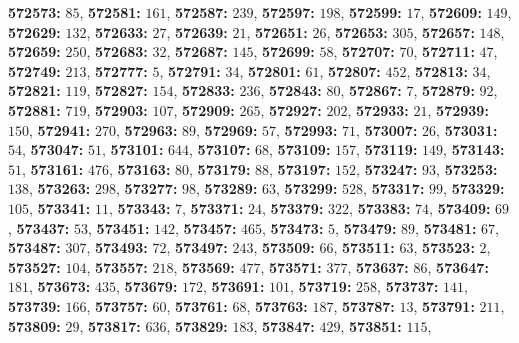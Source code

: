 \textsf{\bfseries 572573:} $85$, \textsf{\bfseries 572581:} $161$, \textsf{\bfseries 572587:} $239$, \textsf{\bfseries 572597:} $198$, \textsf{\bfseries 572599:} $17$, \textsf{\bfseries 572609:} $149$, \textsf{\bfseries 572629:} $132$, \textsf{\bfseries 572633:} $27$, \textsf{\bfseries 572639:} $21$, \textsf{\bfseries 572651:} $26$, \textsf{\bfseries 572653:} $305$, \textsf{\bfseries 572657:} $148$, \textsf{\bfseries 572659:} $250$, \textsf{\bfseries 572683:} $32$, \textsf{\bfseries 572687:} $145$, \textsf{\bfseries 572699:} $58$, \textsf{\bfseries 572707:} $70$, \textsf{\bfseries 572711:} $47$, \textsf{\bfseries 572749:} $213$, \textsf{\bfseries 572777:} $5$, \textsf{\bfseries 572791:} $34$, \textsf{\bfseries 572801:} $61$, \textsf{\bfseries 572807:} $452$, \textsf{\bfseries 572813:} $34$, \textsf{\bfseries 572821:} $119$, \textsf{\bfseries 572827:} $154$, \textsf{\bfseries 572833:} $236$, \textsf{\bfseries 572843:} $80$, \textsf{\bfseries 572867:} $7$, \textsf{\bfseries 572879:} $92$, \textsf{\bfseries 572881:} $719$, \textsf{\bfseries 572903:} $107$, \textsf{\bfseries 572909:} $265$, \textsf{\bfseries 572927:} $202$, \textsf{\bfseries 572933:} $21$, \textsf{\bfseries 572939:} $150$, \textsf{\bfseries 572941:} $270$, \textsf{\bfseries 572963:} $89$, \textsf{\bfseries 572969:} $57$, \textsf{\bfseries 572993:} $71$, \textsf{\bfseries 573007:} $26$, \textsf{\bfseries 573031:} $54$, \textsf{\bfseries 573047:} $51$, \textsf{\bfseries 573101:} $644$, \textsf{\bfseries 573107:} $68$, \textsf{\bfseries 573109:} $157$, \textsf{\bfseries 573119:} $149$, \textsf{\bfseries 573143:} $51$, \textsf{\bfseries 573161:} $476$, \textsf{\bfseries 573163:} $80$, \textsf{\bfseries 573179:} $88$, \textsf{\bfseries 573197:} $152$, \textsf{\bfseries 573247:} $93$, \textsf{\bfseries 573253:} $138$, \textsf{\bfseries 573263:} $298$, \textsf{\bfseries 573277:} $98$, \textsf{\bfseries 573289:} $63$, \textsf{\bfseries 573299:} $528$, \textsf{\bfseries 573317:} $99$, \textsf{\bfseries 573329:} $105$, \textsf{\bfseries 573341:} $11$, \textsf{\bfseries 573343:} $7$, \textsf{\bfseries 573371:} $24$, \textsf{\bfseries 573379:} $322$, \textsf{\bfseries 573383:} $74$, \textsf{\bfseries 573409:} $69$, \textsf{\bfseries 573437:} $53$, \textsf{\bfseries 573451:} $142$, \textsf{\bfseries 573457:} $465$, \textsf{\bfseries 573473:} $5$, \textsf{\bfseries 573479:} $89$, \textsf{\bfseries 573481:} $67$, \textsf{\bfseries 573487:} $307$, \textsf{\bfseries 573493:} $72$, \textsf{\bfseries 573497:} $243$, \textsf{\bfseries 573509:} $66$, \textsf{\bfseries 573511:} $63$, \textsf{\bfseries 573523:} $2$, \textsf{\bfseries 573527:} $104$, \textsf{\bfseries 573557:} $218$, \textsf{\bfseries 573569:} $477$, \textsf{\bfseries 573571:} $377$, \textsf{\bfseries 573637:} $86$, \textsf{\bfseries 573647:} $181$, \textsf{\bfseries 573673:} $435$, \textsf{\bfseries 573679:} $172$, \textsf{\bfseries 573691:} $101$, \textsf{\bfseries 573719:} $258$, \textsf{\bfseries 573737:} $141$, \textsf{\bfseries 573739:} $166$, \textsf{\bfseries 573757:} $60$, \textsf{\bfseries 573761:} $68$, \textsf{\bfseries 573763:} $187$, \textsf{\bfseries 573787:} $13$, \textsf{\bfseries 573791:} $211$, \textsf{\bfseries 573809:} $29$, \textsf{\bfseries 573817:} $636$, \textsf{\bfseries 573829:} $183$, \textsf{\bfseries 573847:} $429$, \textsf{\bfseries 573851:} $115$, 
